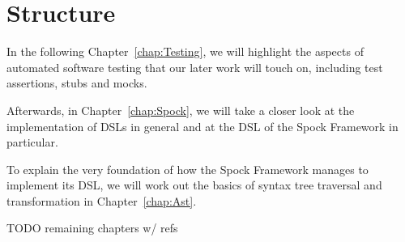 \section{Structure}
In the following Chapter~\ref{chap:Testing},
we will highlight the aspects of automated software testing
that our later work will touch on,
including test assertions, stubs and mocks.

Afterwards, in Chapter~\ref{chap:Spock},
we will take a closer look at the implementation of DSLs in general
and at the DSL of the Spock Framework in particular.

To explain the very foundation of how the Spock Framework
manages to implement its DSL,
we will work out the basics of
syntax tree traversal and transformation
in Chapter~\ref{chap:Ast}.

TODO remaining chapters w/ refs
